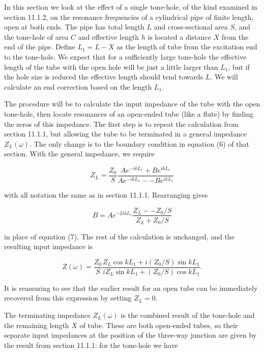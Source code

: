   In this section we look at the effect of a single tone-hole, of the kind 
  examined in section 11.1.2, on the resonance frequencies of a cylindrical 
  pipe of finite length, open at both ends. The pipe has total length $L$ and 
  cross-sectional area $S$, and the tone-hole of area $C$ and effective length 
  $h$ is located a distance $X$ from the end of the pipe. Define $L_1=L-X$ as 
  the length of tube from the excitation end to the tone-hole. We expect that 
  for a sufficiently large tone-hole the effective length of the tube with the 
  open hole will be just a little larger than $L_1$, but if the hole size is 
  reduced the effective length should tend towards $L$. We will calculate an 
  end correction based on the length $L_1$. 

  The procedure will be to calculate the input impedance of the tube with the 
  open tone-hole, then locate resonances of an open-ended tube (like a flute) 
  by finding the zeros of this impedance. The first step is to repeat the 
  calculation from section 11.1.1, but allowing the tube to be terminated in a 
  general impedance $Z_L(\omega)$. The only change is to the boundary condition 
  in equation (6) of that section. With the general impedance, we require 

  \begin{equation*}Z_L = \dfrac{Z_0}{S}\dfrac{Ae^{-ikL_1} + B 
  e^{ikL_1}}{Ae^{-ikL_1} -- B e^{ikL_1}} \tag{1}\end{equation*} 

  \noindent{}with all notation the same as in section 11.1.1. Rearranging gives 

  \begin{equation*}B=A e^{-2ikL_1}\dfrac{Z_L -- Z_0/S}{Z_L + Z_0/S} 
  \tag{2}\end{equation*} 

  \noindent{}in place of equation (7). The rest of the calculation is 
  unchanged, and the resulting input impedance is 

  \begin{equation*}Z(\omega) = \dfrac{Z_0}{S}\dfrac{Z_L \cos kL_1 + i(Z_0/S) 
  \sin kL_1}{iZ_L \sin kL_1 + (Z_0/S) \cos kL_1} . \tag{3}\end{equation*} 

  It is reassuring to see that the earlier result for an open tube can be 
  immediately recovered from this expression by setting $Z_L=0$. 

  The terminating impedance $Z_L(\omega)$ is the combined result of the 
  tone-hole and the remaining length $X$ of tube. These are both open-ended 
  tubes, so their separate input impedances at the position of the three-way 
  junction are given by the result from section 11.1.1: for the tone-hole we 
  have 

